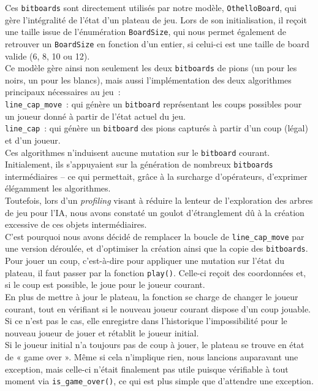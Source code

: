 \documentclass[a4paper,12pt]{article}
\begin{document}
Ces \texttt{bitboards} sont directement utilisés par notre modèle,
\texttt{OthelloBoard}, qui gère l’intégralité de l’état d’un plateau de jeu.
Lors de son initialisation, il reçoit une taille issue de l’énumération
\texttt{BoardSize}, qui nous permet également de retrouver un
\texttt{BoardSize} en fonction d’un entier, si celui-ci est une taille de board
valide (6, 8, 10 ou 12).\\ Ce modèle gère ainsi non seulement les deux
\texttt{bitboards} de pions (un pour les noirs, un pour les blancs), mais aussi
l’implémentation des deux algorithmes principaux nécessaires au jeu~:\\
\texttt{line\_cap\_move}~: qui génère un \texttt{bitboard} représentant les
coups possibles pour un joueur donné à partir de l’état actuel du jeu.\\
\texttt{line\_cap}~: qui génère un \texttt{bitboard} des pions capturés à
partir d’un coup (légal) et d’un joueur.\\

Ces algorithmes n’induisent aucune mutation sur le \texttt{bitboard} courant.
Initialement, ils s’appuyaient sur la génération de nombreux \texttt{bitboards}
intermédiaires – ce qui permettait, grâce à la surcharge d’opérateurs,
d’exprimer élégamment les algorithmes.\\ Toutefois, lors d’un
\textit{profiling} visant à réduire la lenteur de l’exploration des arbres de
jeu pour l’IA, nous avons constaté un goulot d’étranglement dû à la création
excessive de ces objets intermédiaires.\\ C’est pourquoi nous avons décidé de
remplacer la boucle de \texttt{line\_cap\_move} par une version déroulée, et
d’optimiser la création ainsi que la copie des \texttt{bitboards}.\\

Pour jouer un coup, c’est-à-dire pour appliquer une mutation sur l’état du
plateau, il faut passer par la fonction \texttt{play()}. Celle-ci reçoit des
coordonnées et, si le coup est possible, le joue pour le joueur courant.\\ En
plus de mettre à jour le plateau, la fonction se charge de changer le joueur
courant, tout en vérifiant si le nouveau joueur courant dispose d’un coup
jouable. Si ce n’est pas le cas, elle enregistre dans l’historique
l’impossibilité pour le nouveau joueur de jouer et rétablit le joueur
initial.\\

Si le joueur initial n’a toujours pas de coup à jouer, le plateau se trouve en
état de « game over ». Même si cela n’implique rien, nous lancions auparavant
une exception, mais celle-ci n’était finalement pas utile puisque vérifiable à
tout moment via \texttt{is\_game\_over()}, ce qui est plus simple que
d’attendre une exception.\\
\end{document}
